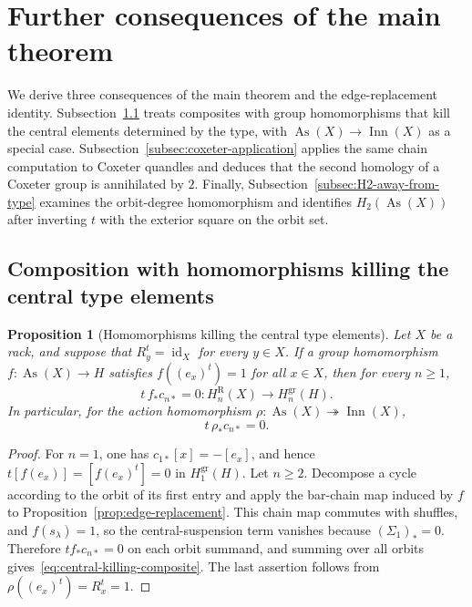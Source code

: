 \documentclass[11pt]{article}
\newtheorem{proposition}[theorem]{Proposition}
\DeclareMathOperator{\As}{As}
\DeclareMathOperator{\Inn}{Inn}
\newcommand{\gr}{\mathrm{gr}}
\newcommand{\R}{\mathrm R}
\begin{document}
\section{Further consequences of the main theorem}

We derive three consequences of the main theorem and the edge-replacement
identity. Subsection~\ref{subsec:central-killing-composite} treats composites
with group homomorphisms that kill the central elements determined by the
type, with $\As(X)\to\Inn(X)$ as a special case.
Subsection~\ref{subsec:coxeter-application} applies the same chain computation
to Coxeter quandles and deduces that the second homology of a Coxeter group is
annihilated by $2$. Finally, Subsection~\ref{subsec:H2-away-from-type}
examines the orbit-degree homomorphism and identifies $H_2(\As(X))$ after
inverting $t$ with the exterior square on the orbit set.

\subsection{Composition with homomorphisms killing the central type elements}
\label{subsec:central-killing-composite}

\begin{proposition}[Homomorphisms killing the central type elements]
\label{prop:central-killing-composite}
Let $X$ be a rack, and suppose that
$R_y^t=\operatorname{id}_X$ for every $y\in X$. If a group homomorphism
$f\colon\As(X)\to H$ satisfies
$f((e_x)^t)=1$ for all $x\in X$, then for every $n\ge1$,
\begin{equation}
 t\,f_*c_{n*}=0
 \colon H_n^\R(X)\longrightarrow H_n^{\gr}(H).
 \label{eq:central-killing-composite}
\end{equation}
In particular, for the action homomorphism
$\rho\colon\As(X)\twoheadrightarrow\Inn(X)$,
\[
 t\,\rho_*c_{n*}=0.
\]
\end{proposition}

\begin{proof}
For $n=1$, one has $c_{1*}[x]=-[e_x]$, and hence
$t[f(e_x)]=[f(e_x)^t]=0$ in $H_1^{\gr}(H)$. Let $n\ge2$. Decompose a cycle according to the
orbit of its first entry and apply the bar-chain map induced by $f$ to Proposition~\ref{prop:edge-replacement}. This chain map commutes with shuffles, and
$f(s_\lambda)=1$, so the central-suspension term vanishes because
$(\Sigma_1)_*=0$. Therefore $t f_*c_{n*}=0$ on each orbit summand, and summing
over all orbits gives~\eqref{eq:central-killing-composite}. The last assertion
follows from $\rho((e_x)^t)=R_x^t=1$.
\end{proof}
\end{document}
